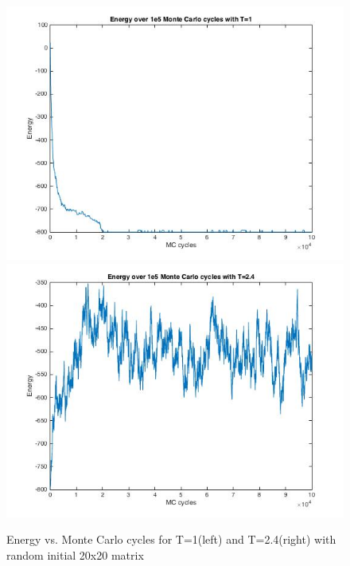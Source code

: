 \documentclass[10pt,a4paper]{article}
\begin{document}
\begin{figure}[H]
\centerline{
\includegraphics[scale=0.4]{energy20_1e5mc}
\includegraphics[scale=0.4]{energy20_1e5mc_T24}
}
\caption{Energy vs. Monte Carlo cycles for T=1(left) and T=2.4(right) with random initial 20x20 matrix}
\label{fig:energy_20_1e5}
\end{figure}
\end{document}
